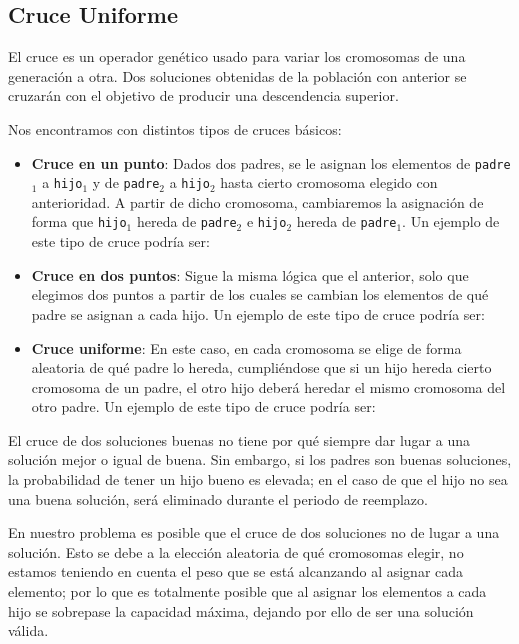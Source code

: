 \subsection{Cruce Uniforme}

El cruce es un operador genético usado para variar los cromosomas de una generación a otra. 
Dos soluciones obtenidas de la población con anterior se cruzarán con el objetivo de producir una descendencia superior. 

Nos encontramos con distintos tipos de cruces básicos:
\begin{itemize}
	\item \textbf{Cruce en un punto}:  Dados dos padres, se le asignan los elementos de \texttt{padre$_1$} a \texttt{hijo$_1$} y de \texttt{padre$_2$} a \texttt{hijo$_2$} hasta cierto cromosoma elegido con anterioridad. 
A partir de dicho cromosoma, cambiaremos la asignación de forma que \texttt{hijo$_1$} hereda de \texttt{padre$_2$} e \texttt{hijo$_2$} hereda de \texttt{padre$_1$}. 
Un ejemplo de este tipo de cruce podría ser:
	\item \textbf{Cruce en dos puntos}: Sigue la misma lógica que el anterior, solo que elegimos dos puntos a partir de los cuales se cambian los elementos de qué padre se asignan a cada hijo. 
Un ejemplo de este tipo de cruce podría ser:
	\item \textbf{Cruce uniforme}: En este caso, en cada cromosoma se elige de forma aleatoria de qué padre lo hereda, cumpliéndose que si un hijo hereda cierto cromosoma de un padre, el otro hijo deberá heredar el mismo cromosoma del otro padre. 
Un ejemplo de este tipo de cruce podría ser: 
\end{itemize}

El cruce de dos soluciones buenas no tiene por qué siempre dar lugar a una solución mejor o igual de buena. 
Sin embargo, si los padres son buenas soluciones, la probabilidad de tener un hijo bueno es elevada; en el caso de que el hijo no sea una buena solución, será eliminado durante el periodo de reemplazo. 

En nuestro problema es posible que el cruce de dos soluciones no de lugar a una solución. 
Esto se debe a la elección aleatoria de qué cromosomas elegir, no estamos teniendo en cuenta el peso que se está alcanzando al asignar cada elemento; por lo que es totalmente posible que  al asignar los elementos a cada hijo se sobrepase la capacidad máxima, dejando por ello de ser una solución válida. 

